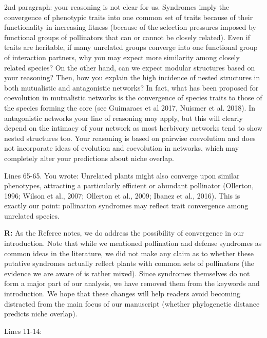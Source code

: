 \documentclass[12pt]{letter}
\newenvironment{refquote}{\bigskip \begin{it}}{\end{it}\smallskip}
\begin{document}
		\begin{refquote}
			2nd paragraph: your reasoning is not clear for us. Syndromes imply the convergence of phenotypic traits into one common set of traits because of their functionality in increasing fitness (because of the selection pressures imposed by functional groups of pollinators that can or cannot be closely related). Even if traits are heritable, if many unrelated groups converge into one functional group of interaction partners, why you may expect more similarity among closely related species? On the other hand, can we expect modular structures based on your reasoning? Then, how you explain the high incidence of nested structures in both mutualistic and antagonistic networks? In fact, what has been proposed for coevolution in mutualistic networks is the convergence of species traits to those of the species forming the core (see Guimaraes et al 2017, Nuismer et al. 2018). In antagonistic networks your line of reasoning may apply, but this will clearly depend on the intimacy of your network as most herbivory networks tend to show nested structures too. Your reasoning is based on pairwise coevolution and does not incorporate ideas of evolution and coevolution in networks, which may completely alter your predictions about niche overlap.
		\end{refquote}


		\begin{refquote}
			Lines 65-65. You wrote: Unrelated plants might also converge upon similar phenotypes, attracting a particularly efficient or abundant pollinator (Ollerton, 1996; Wilson et al., 2007; Ollerton et al., 2009; Ibanez et al., 2016). This is exactly our point: pollination syndromes may reflect trait convergence among unrelated species.
		\end{refquote}


		\textbf{R:} As the Referee notes, we do address the possibility of convergence in our introduction. Note that while we mentioned pollination and defense syndromes as common ideas in the literature, we did not make any claim as to whether these putative syndromes actually reflect plants with common sets of pollinators (the evidence we are aware of is rather mixed). Since syndromes themselves do not form a major part of our analysis, we have removed them from the keywords and introduction. We hope that these changes will help readers avoid becoming distracted from the main focus of our manuscript (whether phylogenetic distance predicts niche overlap).


		Lines 11-14:
\end{document}
